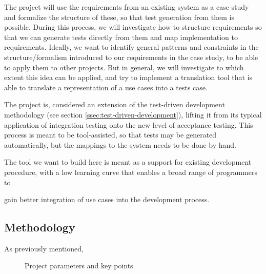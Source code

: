 \noindent The project will use the requirements from an existing system as a case study and formalize the structure of these, so that test generation from them is possible. During this process, we will investigate how to structure requirements so that we can generate tests directly from them and map implementation to requirements. Ideally, we want to identify general patterns and constraints in the structure/formalism introduced to our requirements in the case study, to be able to apply them to other projects. But in general, we will investigate to which extent this idea can be applied, and try to implement a translation tool that is able to translate a representation of a use cases into a tests case.\medskip

\noindent The project is, considered an extension of the test-driven development methodology (see section \ref{ssec:test-driven-development}), lifting it from its typical application of integration testing onto the new level of acceptance testing. This process is meant to be tool-assisted, so that tests may be generated automatically, but the mappings to the system needs to be done by hand.

The tool we want to build here is meant as a support for existing development procedure, with a low learning curve that enables a broad range of programmers to 

gain better integration of use cases into the development process.

\subsection{Methodology}
As previously mentioned, 
\begin{figure}
\centering
{}
\caption{Project parameters and key points}
\label{fig:project_parameter_plot}
\end{figure}

